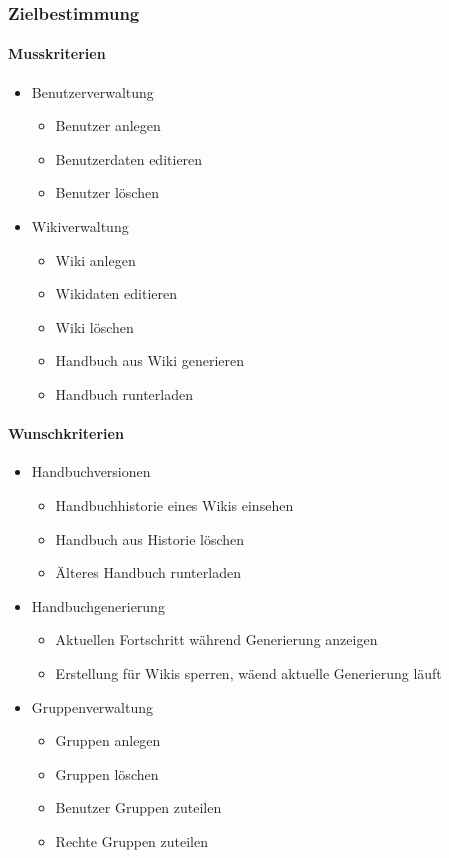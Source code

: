 \label{app:lastenehft}

\subsubsection*{Zielbestimmung}

	\paragraph*{Musskriterien}
		\begin{itemize}
			\item Benutzerverwaltung
			\begin{itemize}
				\item Benutzer anlegen
				\item Benutzerdaten editieren
				\item Benutzer löschen
			\end{itemize}
			\item Wikiverwaltung
			\begin{itemize}
				\item Wiki anlegen
				\item Wikidaten editieren
				\item Wiki löschen
				\item Handbuch aus Wiki generieren
				\item Handbuch runterladen
			\end{itemize}
		\end{itemize}

	\paragraph*{Wunschkriterien}
		\begin{itemize}
			\item Handbuchversionen
			\begin{itemize}
				\item Handbuchhistorie eines Wikis einsehen
				\item Handbuch aus Historie löschen
				\item Älteres Handbuch runterladen
			\end{itemize}
			\item Handbuchgenerierung
			\begin{itemize}
				\item Aktuellen Fortschritt während Generierung anzeigen
				\item Erstellung für Wikis sperren, wäend aktuelle Generierung läuft
			\end{itemize}
			\item Gruppenverwaltung
			\begin{itemize}
				\item Gruppen anlegen
				\item Gruppen löschen
				\item Benutzer Gruppen zuteilen
				\item Rechte Gruppen zuteilen
			\end{itemize}
		\end{itemize}

